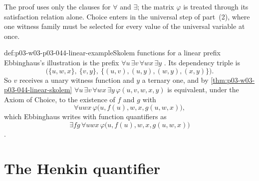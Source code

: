 The proof uses only the clauses for \(\forall\) and \(\exists\); the matrix
\(\varphi\) is treated through its satisfaction relation alone.  Choice
enters in the universal step of part~(2), where one witness family must be
selected for every value of the universal variable at once.

\begin{hbexample}{def:p03-w03-p03-044-linear-example}{Skolem functions for a linear prefix}
Ebbinghaus's illustration is the prefix
\(\forall u\,\exists v\,\forall wx\,\exists y\)
\cite[p.~38]{Ebbinghaus1985ExtendedLogics}.  Its dependency triple is
\[
 \bigl(\{u,w,x\},\ \{v,y\},\ \{(u,v),(u,y),(w,y),(x,y)\}\bigr).
\]
So \(v\) receives a unary witness function and \(y\) a ternary one, and by
\cref{thm:p03-w03-p03-044-linear-skolem}
\(\forall u\,\exists v\,\forall wx\,\exists y\,\varphi(u,v,w,x,y)\) is
equivalent, under the Axiom of Choice, to the existence of \(f\) and \(g\)
with
\[
 \forall uwx\,\varphi\bigl(u,f(u),w,x,g(u,w,x)\bigr),
\]
which Ebbinghaus writes with function quantifiers as
\[
 \exists fg\,\forall uwx\,\varphi\bigl(u,f(u),w,x,g(u,w,x)\bigr)
\]
\cite[p.~38]{Ebbinghaus1985ExtendedLogics}.
\end{hbexample}

\section{The Henkin quantifier}
\label{sec:p03-w03-p03-044-henkin-quantifier}

